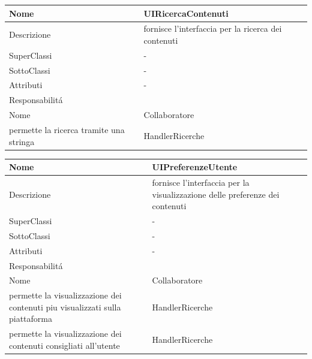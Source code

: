 \begin{center} %
    \begin{longtable}{ |p{3cm}|p{3cm}|p{3cm}|p{3cm}| }
        \hline
        Nome & \multicolumn{3}{|p{9cm}|}{UIRicercaContenuti} \\\hline
        Descrizione & \multicolumn{3}{|p{9cm}|}{fornisce l'interfaccia per la ricerca dei contenuti} \\\hline
        SuperClassi & \multicolumn{3}{|p{9cm}|}{-} \\\hline
        SottoClassi & \multicolumn{3}{|p{9cm}|}{-} \\\hline
        Attributi & \multicolumn{3}{|p{9cm}|}{-} \\\hline
        \multicolumn{4}{|p{12cm}|}{Responsabilit\'a} \\\hline %
        \multicolumn{2}{|p{6cm}|}{Nome} & \multicolumn{2}{|p{6cm}|}{Collaboratore} \\\hline %
        \multicolumn{2}{|p{6cm}|}{permette la ricerca tramite una stringa} & \multicolumn{2}{|p{6cm}|}{HandlerRicerche} \\\hline        
    \end{longtable}
\end{center}

\begin{center} %
    \begin{longtable}{ |p{3cm}|p{3cm}|p{3cm}|p{3cm}| }
        \hline
        Nome & \multicolumn{3}{|p{9cm}|}{UIPreferenzeUtente} \\\hline
        Descrizione & \multicolumn{3}{|p{9cm}|}{fornisce l'interfaccia per la visualizzazione delle preferenze dei contenuti} \\\hline
        SuperClassi & \multicolumn{3}{|p{9cm}|}{-} \\\hline
        SottoClassi & \multicolumn{3}{|p{9cm}|}{-} \\\hline
        Attributi & \multicolumn{3}{|p{9cm}|}{-} \\\hline
        \multicolumn{4}{|p{12cm}|}{Responsabilit\'a} \\\hline %
        \multicolumn{2}{|p{6cm}|}{Nome} & \multicolumn{2}{|p{6cm}|}{Collaboratore} \\\hline %
        \multicolumn{2}{|p{6cm}|}{permette la visualizzazione dei contenuti piu visualizzati sulla piattaforma} & \multicolumn{2}{|p{6cm}|}{HandlerRicerche} \\\hline        
        \multicolumn{2}{|p{6cm}|}{permette la visualizzazione dei contenuti consigliati all'utente} & \multicolumn{2}{|p{6cm}|}{HandlerRicerche} \\\hline        
    \end{longtable}
\end{center}

